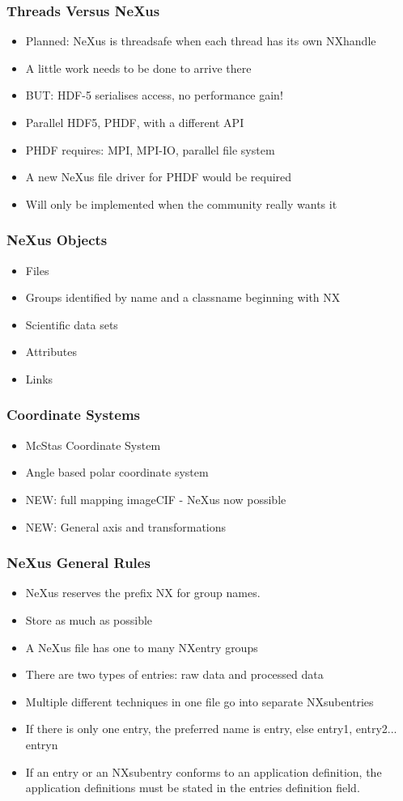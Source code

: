 \documentclass{beamer}
\begin{document}
\begin{frame} \frametitle{Threads Versus NeXus}
\begin{itemize}
\item Planned: NeXus is threadsafe when each thread has its own NXhandle
\item A little work needs to be done to arrive there
\item {\color{red}BUT:} HDF-5 serialises access, no performance gain!
\item Parallel HDF5, PHDF, with a different API
\item PHDF requires: MPI, MPI-IO, parallel file system
\item A new NeXus file driver for PHDF would be required
\item Will only be implemented when the community really wants it
\end{itemize}
\end{frame}

\begin{frame} \frametitle{NeXus Objects}
\begin{itemize}
\item Files
\item Groups identified by name and a classname beginning with NX
\item Scientific data sets
\item Attributes
\item Links
\end{itemize}
\end{frame}

\begin{frame} \frametitle{Coordinate Systems}
\begin{itemize}
\item McStas Coordinate System
\item Angle based polar coordinate system
\item {\color{red}NEW: full mapping imageCIF - NeXus now possible}
\item {\color{red}NEW: General axis and transformations}
\end{itemize}
\end{frame}


\begin{frame}
\frametitle{NeXus General Rules}
\begin{itemize}
\item NeXus reserves the prefix NX for group names.  
\item Store as much as possible
\item A NeXus file has one to many NXentry groups 
\item There are two types of entries: raw data and processed data
\item Multiple different techniques in one file go into separate NXsubentries
\item If there is only one entry, the preferred name is entry, else entry1, entry2... entryn
\item If an entry or an NXsubentry conforms to an application definition, 
 the application definitions must be stated in the 
 entries definition field.
\end{itemize}
\end{frame}
\end{document}
